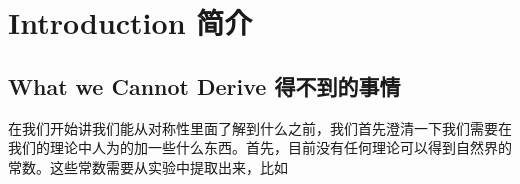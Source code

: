 


\chapter{Introduction 简介}\label{chap1}

\section{What we Cannot Derive 得不到的事情}

在我们开始讲我们能从对称性里面了解到什么之前，我们首先澄清一下我们需要在我们的理论中人为的加一些什么东西。首先，目前没有任何理论可以得到自然界的常数。这些常数需要从实验中提取出来，比如